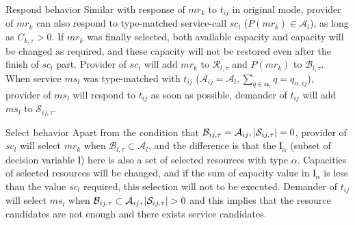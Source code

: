 \begin{asparaenum}
\item Respond behavior
Similar with response of $mr_k$ to $t_{ij}$ in original mode, provider of $mr_k$ can also respond to type-matched service-call $sc_l$ ($P(mr_k)\in\mathcal{A}_l$), as long as $C_{k,\tau}> 0$. If $mr_k$ was finally selected, both available capacity and capacity will be changed as required, and these capacity will not be restored even after the finish of $sc_l$ part. Provider of $sc_l$ will add $mr_k$ to $\mathcal{R}_{l,\tau}$ and $P(mr_k)$ to $\mathcal{B}_{l,\tau}$. When service $ms_l$ was type-matched with $t_{ij}$ ($\mathcal{A}_{ij} =\mathcal{A}_l,\sum_{q\in\bm{\alpha}_l} q = q_{\alpha,ij}$), provider of $ms_l$ will respond to $t_{ij}$ as soon as possible, demander of $t_{ij}$ will add $ms_l$ to $\mathcal{S}_{ij,\tau}$.



\item Select behavior
Apart from the condition that $\mathcal{B}_{ij,\tau} = \mathcal{A}_{ij},\left|\mathcal{S}_{ij,\tau}\right|=0$, provider of $sc_l$ will select $mr_k$ when $\mathcal{B}_{l,\tau}\subset\mathcal{A}_l$, and the difference is that the $\bm{l}_{\alpha}$ (subset of decision variable $\bm{l}$) here is also a set of selected resources with type $\alpha$. Capacities of selected resources will be changed, and if the sum of capacity value in $\bm{l}_{\alpha}$ is less than the value $sc_l$ required, this selection will not to be executed.
Demander of $t_{ij}$ will select $ms_l$ when $\mathcal{B}_{ij,\tau}\subset\mathcal{A}_{ij},\abs{\mathcal{S}_{ij,\tau}}>0$ and this implies that the resource candidates are not enough and there exists service candidates.


\end{asparaenum}
